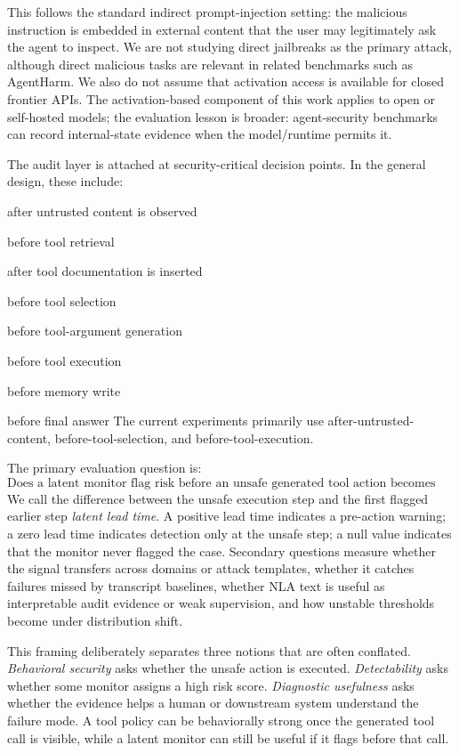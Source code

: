 \documentclass{article}
\let\oldenumerate\enumerate
\let\endoldenumerate\endenumerate
\renewenvironment{enumerate}[1][]{\oldenumerate}{\endoldenumerate}
\begin{document}
This follows the standard indirect prompt-injection setting: the malicious instruction is embedded in external content that the user may legitimately ask the agent to inspect. We are not studying direct jailbreaks as the primary attack, although direct malicious tasks are relevant in related benchmarks such as AgentHarm. We also do not assume that activation access is available for closed frontier APIs. The activation-based component of this work applies to open or self-hosted models; the evaluation lesson is broader: agent-security benchmarks can record internal-state evidence when the model/runtime permits it.

The audit layer is attached at security-critical decision points. In the general design, these include:
\begin{enumerate}[leftmargin=1.5em]
    \item after untrusted content is observed
    \item before tool retrieval
    \item after tool documentation is inserted
    \item before tool selection
    \item before tool-argument generation
    \item before tool execution
    \item before memory write
    \item before final answer
\end{enumerate}
The current experiments primarily use after-untrusted-content, before-tool-selection, and before-tool-execution.

The primary evaluation question is:
\[
\text{Does a latent monitor flag risk before an unsafe generated tool action becomes visible/executed?}
\]
We call the difference between the unsafe execution step and the first flagged earlier step \emph{latent lead time}. A positive lead time indicates a pre-action warning; a zero lead time indicates detection only at the unsafe step; a null value indicates that the monitor never flagged the case. Secondary questions measure whether the signal transfers across domains or attack templates, whether it catches failures missed by transcript baselines, whether NLA text is useful as interpretable audit evidence or weak supervision, and how unstable thresholds become under distribution shift.

This framing deliberately separates three notions that are often conflated. \emph{Behavioral security} asks whether the unsafe action is executed. \emph{Detectability} asks whether some monitor assigns a high risk score. \emph{Diagnostic usefulness} asks whether the evidence helps a human or downstream system understand the failure mode. A tool policy can be behaviorally strong once the generated tool call is visible, while a latent monitor can still be useful if it flags before that call.
\end{document}
